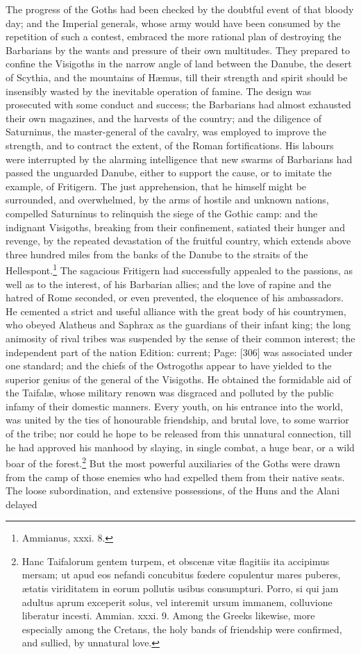 The progress of the Goths had been checked by the doubtful event of that bloody day; and the Imperial generals, whose army would have been consumed by the repetition of such a contest, embraced the more rational plan of destroying the Barbarians by the wants and pressure of their own multitudes. They prepared to confine the Visigoths in the narrow angle of land between the Danube, the desert of Scythia, and the mountains of Hæmus, till their strength and spirit should be insensibly wasted by the inevitable operation of famine. The design was prosecuted with some conduct and success; the Barbarians had almost exhausted their own magazines, and the harvests of the country; and the diligence of Saturninus, the master-general of the cavalry, was employed to improve the strength, and to contract the extent, of the Roman fortifications. His labours were interrupted by the alarming intelligence that new swarms of Barbarians had passed the unguarded Danube, either to support the cause, or to imitate the example, of Fritigern. The just apprehension, that he himself might be surrounded, and overwhelmed, by the arms of hostile and unknown nations, compelled Saturninus to relinquish the siege of the Gothic camp: and the indignant Visigoths, breaking from their confinement, satiated their hunger and revenge, by the repeated devastation of the fruitful country, which extends above three hundred miles from the banks of the Danube to the straits of the Hellespont.\footnote{Ammianus, xxxi. 8.} The sagacious Fritigern had successfully appealed to the passions, as well as to the interest, of his Barbarian allies; and the love of rapine and the hatred of Rome seconded, or even prevented, the eloquence of his ambassadors. He cemented a strict and useful alliance with the great body of his countrymen, who obeyed Alatheus and Saphrax as the guardians of their infant king; the long animosity of rival tribes was suspended by the sense of their common interest; the independent part of the nation Edition: current; Page: [306] was associated under one standard; and the chiefs of the Ostrogoths appear to have yielded to the superior genius of the general of the Visigoths. He obtained the formidable aid of the Taifalæ, whose military renown was disgraced and polluted by the public infamy of their domestic manners. Every youth, on his entrance into the world, was united by the ties of honourable friendship, and brutal love, to some warrior of the tribe; nor could he hope to be released from this unnatural connection, till he had approved his manhood by slaying, in single combat, a huge bear, or a wild boar of the forest.\footnote{Hanc Taifalorum gentem turpem, et obscenæ vitæ flagitiis ita accipimus mersam; ut apud eos nefandi concubitus fœdere copulentur mares puberes, ætatis viriditatem in eorum pollutis usibus consumpturi. Porro, si qui jam adultus aprum exceperit solus, vel interemit ursum immanem, colluvione liberatur incesti. Ammian. xxxi. 9. Among the Greeks likewise, more especially among the Cretans, the holy bands of friendship were confirmed, and sullied, by unnatural love.} But the most powerful auxiliaries of the Goths were drawn from the camp of those enemies who had expelled them from their native seats. The loose subordination, and extensive possessions, of the Huns and the Alani delayed 